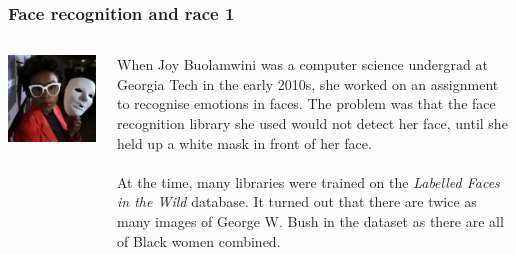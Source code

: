 \documentclass{beamer}
\begin{document}


\begin{frame}
\frametitle{Face recognition and race 1}
\begin{columns}
    \begin{column}{0.3\textwidth}
        \includegraphics[width=1\textwidth]{./images/joy_buolamwini.jpg}
    \end{column}
    \begin{column}{0.67\textwidth}
        When Joy Buolamwini was a computer science undergrad at Georgia Tech in the early 2010s, she worked on an assignment to recognise emotions in faces. The problem was that the face recognition library she used would not detect her face, until she held up a white mask in front of her face.
        \\~\\
        At the time, many libraries were trained on the \emph{Labelled Faces in the Wild} database. It turned out that there are twice as many images of George W. Bush in the dataset as there are all of Black women combined.
    \end{column}
\end{columns}
\end{frame}
\end{document}
